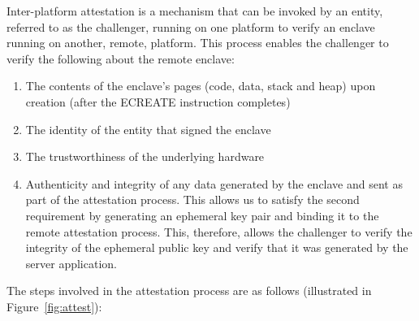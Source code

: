 \documentclass[../main.tex]{subfiles}
\begin{document}
Inter-platform attestation is a mechanism that can be invoked by an
entity, referred to as the challenger, running on one platform to
verify an enclave running on another, remote, platform. This process
enables the challenger to verify the following about the remote
enclave:
\begin{enumerate}
  \item The contents of the enclave's pages (code, data, stack and heap)
    upon creation (after the ECREATE instruction completes)
  \item The identity of the entity that signed the enclave
  \item The trustworthiness of the underlying hardware
  \item Authenticity and integrity of any data generated by the enclave
    and sent as part of the attestation process. This allows us to
    satisfy the second requirement by generating an ephemeral key pair
    and binding it to the remote attestation process. This, therefore,
    allows the challenger to verify the integrity of the ephemeral
    public key and verify that it was generated by the server
    application.
\end{enumerate}
The steps involved in the attestation process are as follows
(illustrated in Figure~\ref{fig:attest}):
\end{document}
